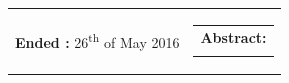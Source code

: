 \begin{titlepage}
\begin{nopagebreak}
{\begin{tabular}{cc}
{\begin{description}
						\item {\bf Ended :} 
							26\textsuperscript{th} of May 2016
					\end{description}
				} &
				\parbox[t]{.45\textwidth}{
					\vspace{.15cm}
					\hfill 
					\begin{tabular}[t]{l}
						{\bf Abstract:}\bigskip \\
						\fbox{
							\parbox{.35\textwidth}{\smallskip
								{\vfill{\small 
								\smallskip}}
							}
						}
					\end{tabular}
				}
			\end{tabular}
		}
	\end{nopagebreak}
\end{titlepage}
